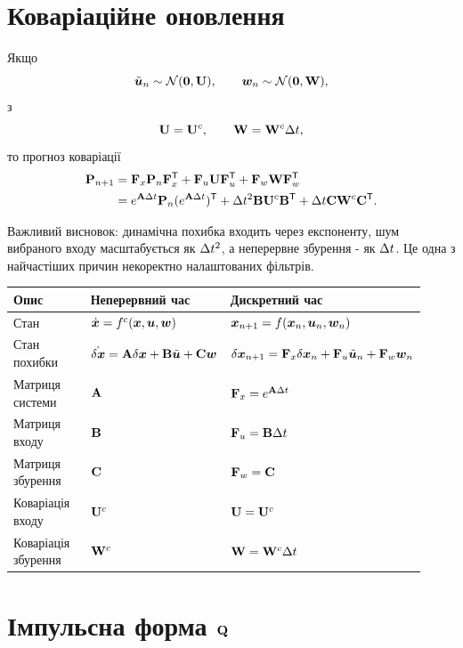 \section{Коваріаційне оновлення}

Якщо
\begin{equation}
\tilde{\bm{u}}_n\sim\mathcal{N}(\bm{0},\mathbf{U}),\qquad
\bm{w}_n\sim\mathcal{N}(\bm{0},\mathbf{W}),
\end{equation}
з
\begin{equation}
\mathbf{U}=\mathbf{U}^{c},\qquad \mathbf{W}=\mathbf{W}^{c}\Delta t,
\end{equation}
то прогноз коваріації
\begin{align}\label{eq:cov_update_dt_terms}
\mathbf{P}_{n+1}
&=\mathbf{F}_x\mathbf{P}_n\mathbf{F}_x^{\mathsf{T}}
+\mathbf{F}_u\mathbf{U}\mathbf{F}_u^{\mathsf{T}}
+\mathbf{F}_w\mathbf{W}\mathbf{F}_w^{\mathsf{T}}\\
&=e^{\mathbf{A}\Delta t}\mathbf{P}_n(e^{\mathbf{A}\Delta t})^{\mathsf{T}}
+\Delta t^2\mathbf{B}\mathbf{U}^{c}\mathbf{B}^{\mathsf{T}}
+\Delta t\mathbf{C}\mathbf{W}^{c}\mathbf{C}^{\mathsf{T}}.
\end{align}

Важливий висновок: динамічна похибка входить через експоненту, шум вибраного входу масштабується як $\Delta t^2$, а неперервне збурення - як $\Delta t$. Це одна з найчастіших причин некоректно налаштованих фільтрів.

\begin{longtable}{L{0.28\linewidth}L{0.32\linewidth}L{0.32\linewidth}}
\toprule
Опис & Неперервний час & Дискретний час\\
\midrule
Стан & $\dot{\bm{x}}=f^c(\bm{x},\bm{u},\bm{w})$ & $\bm{x}_{n+1}=f(\bm{x}_n,\bm{u}_n,\bm{w}_n)$\\
Стан похибки & $\dot{\delta\bm{x}}=\mathbf{A}\delta\bm{x}+\mathbf{B}\tilde{\bm{u}}+\mathbf{C}\bm{w}$ & $\delta\bm{x}_{n+1}=\mathbf{F}_{x}\delta\bm{x}_{n}+\mathbf{F}_{u}\tilde{\bm{u}}_n+\mathbf{F}_{w}\bm{w}_n$\\
Матриця системи & $\mathbf{A}$ & $\mathbf{F}_{x}=e^{\mathbf{A}\Delta t}$\\
Матриця входу & $\mathbf{B}$ & $\mathbf{F}_{u}=\mathbf{B}\Delta t$\\
Матриця збурення & $\mathbf{C}$ & $\mathbf{F}_{w}=\mathbf{C}$\\
Коваріація входу & $\mathbf{U}^{c}$ & $\mathbf{U}=\mathbf{U}^{c}$\\
Коваріація збурення & $\mathbf{W}^{c}$ & $\mathbf{W}=\mathbf{W}^{c}\Delta t$\\
\bottomrule
\end{longtable}

\section{Імпульсна форма $\mathbf{Q}$}

